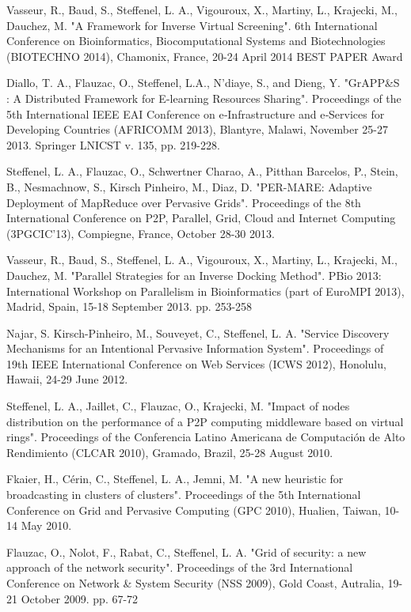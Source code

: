 \documentclass[final,twoside]{hdr} %
\begin{document}
Vasseur, R., Baud, S., Steffenel, L. A., Vigouroux, X., Martiny, L., Krajecki, M., Dauchez, M. "A Framework for Inverse Virtual Screening". 6th International Conference on Bioinformatics, Biocomputational Systems and Biotechnologies (BIOTECHNO 2014), Chamonix, France, 20-24 April 2014 BEST PAPER Award

Diallo, T. A., Flauzac, O., Steffenel, L.A., N’diaye, S., and Dieng, Y. "GrAPP\&S : A Distributed Framework for E-learning Resources Sharing". Proceedings of the 5th International IEEE EAI Conference on e‐Infrastructure and e‐Services for Developing Countries (AFRICOMM 2013), Blantyre, Malawi, November 25-27 2013.  Springer LNICST v. 135, pp. 219-228. 

Steffenel, L. A., Flauzac, O., Schwertner Charao, A., Pitthan Barcelos, P., Stein, B., Nesmachnow, S., Kirsch Pinheiro, M., Diaz, D. "PER-MARE: Adaptive Deployment of MapReduce over Pervasive Grids". Proceedings of the 8th International Conference on P2P, Parallel, Grid, Cloud and Internet Computing (3PGCIC'13), Compiegne, France, October 28-30 2013. 

Vasseur, R., Baud, S., Steffenel, L. A., Vigouroux, X., Martiny, L., Krajecki, M., Dauchez, M. "Parallel Strategies for an Inverse Docking Method". PBio 2013: International Workshop on Parallelism in Bioinformatics (part of EuroMPI 2013), Madrid, Spain, 15-18 September 2013. pp. 253-258

Najar, S. Kirsch-Pinheiro, M., Souveyet, C., Steffenel, L. A. "Service Discovery Mechanisms for an Intentional Pervasive Information System". Proceedings of 19th IEEE International Conference on Web Services (ICWS 2012), Honolulu, Hawaii, 24-29 June 2012. 

Steffenel, L. A., Jaillet, C., Flauzac, O., Krajecki, M. "Impact of nodes distribution on the performance of a P2P computing middleware based on virtual rings". Proceedings of the Conferencia Latino Americana de Computación de Alto Rendimiento (CLCAR 2010), Gramado, Brazil, 25-28 August 2010.

Fkaier, H., Cérin, C., Steffenel, L. A., Jemni, M. "A new heuristic for broadcasting in clusters of clusters". Proceedings of the 5th International Conference on Grid and Pervasive Computing (GPC 2010), Hualien, Taiwan, 10-14 May 2010.

Flauzac, O., Nolot, F., Rabat, C., Steffenel, L. A. "Grid of security: a new approach of the network security". Proceedings of the 3rd International Conference on Network \& System Security (NSS 2009), Gold Coast, Autralia, 19-21 October 2009. pp. 67-72
\end{document}
